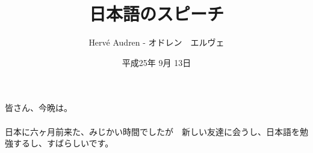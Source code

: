 \documentclass[a4paper,11pt]{article}
\begin{document}
\begin{CJK}{UTF8}{min}
\doublespacing
\author{Herv\'e Audren - オドレン　エルヴェ}
\title{日本語のスピーチ}
\date{平成25年 9月 13日}
\maketitle

\paragraph*{}皆さん、今晩は。
\paragraph*{}日本に六ヶ月前来た、みじかい時間でしたが　新しい友達に会うし、日本語を勉強するし、すばらしいです。

\end{CJK}
\end{document}
